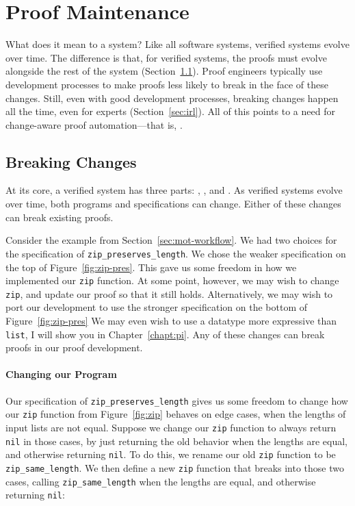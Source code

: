 \section{Proof Maintenance}
\label{sec:mot-mai}

What does it mean to  a  system?
Like all software systems, verified systems evolve over time.
The difference is that, for verified systems, the proofs must evolve alongside the rest of the system (Section~\ref{sec:changes}).
Proof engineers typically use development processes to make proofs less likely to break in the face of these changes.
Still, even with good development processes, breaking changes happen all the time, even for experts (Section~\ref{sec:irl}).
All of this points to a need for change-aware proof automation---that is, .

\subsection{Breaking Changes}
\label{sec:changes}

At its core, a verified system has three parts:
, , and .
As verified systems evolve over time, both programs and specifications can change.
Either of these changes can break existing proofs.

Consider the example from Section~\ref{sec:mot-workflow}.
We had two choices for the specification of \lstinline{zip_preserves_length}.
We chose the weaker specification on the top of Figure~\ref{fig:zip-pres}.
This gave us some freedom in how we implemented our \lstinline{zip} function.
At some point, however, we may wish to change \lstinline{zip}, and update our proof so that it still holds.
Alternatively, we may wish to port our development to use the stronger specification on the bottom of Figure~\ref{fig:zip-pres}
We may even wish to use a datatype more expressive than \lstinline{list}, I will show you in Chapter~\ref{chapt:pi}. %
Any of these changes can break proofs in our proof development.

\paragraph{Changing our Program}

Our specification of \lstinline{zip_preserves_length} gives us some freedom to change how our \lstinline{zip} function from Figure~\ref{fig:zip} behaves on edge cases,
when the lengths of input lists are not equal.
Suppose we change our \lstinline{zip} function to always return \lstinline{nil} in those cases,
by just returning the old behavior when the lengths are equal, and otherwise returning \lstinline{nil}.
To do this, we rename our old \lstinline{zip} function to be \lstinline{zip_same_length}.
We then define a new \lstinline{zip} function that breaks into those two cases, calling \lstinline{zip_same_length}
when the lengths are equal, and otherwise returning \lstinline{nil}:

